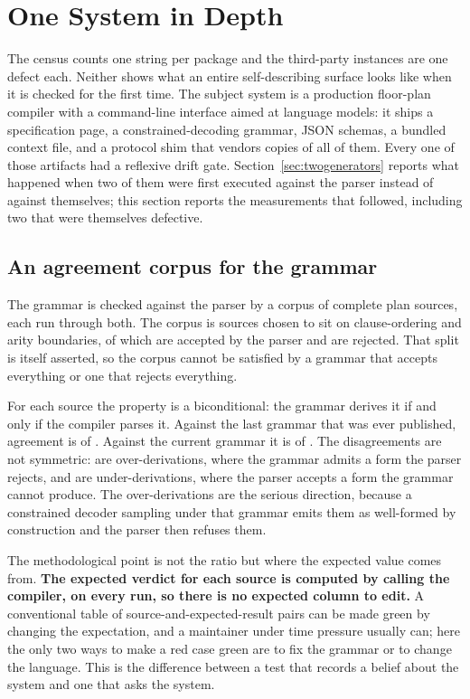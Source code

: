 \documentclass[10pt,journal,compsoc]{IEEEtran}
\begin{document}
\section{One System in Depth}\label{sec:depth}

The census counts one string per package and the third-party instances are one defect each.
Neither shows what an entire self-describing surface looks like when it is checked for the
first time. The subject system is a production floor-plan compiler with a command-line
interface aimed at language models: it ships a specification page, a constrained-decoding
grammar, JSON schemas, a bundled context file, and a protocol shim that vendors copies of all
of them. Every one of those artifacts had a reflexive drift gate. Section~\ref{sec:twogenerators}
reports what happened when two of them were first executed against the parser instead of
against themselves; this section reports the measurements that followed, including two that
were themselves defective.

\subsection{An agreement corpus for the grammar}

The grammar is checked against the parser by a corpus of complete plan sources, each run through
both. The corpus is \factGbnfCorpus{} sources chosen to sit on clause-ordering and arity
boundaries, of which \factGbnfParseable{} are accepted by the parser and \factGbnfRejected{} are
rejected. That split is itself asserted, so the corpus cannot be satisfied by a grammar that
accepts everything or one that rejects everything.

For each source the property is a biconditional: the grammar derives it if and only if the
compiler parses it. Against the last grammar that was ever published, agreement is
\factGbnfAgreeBefore{} of \factGbnfCorpus{}. Against the current grammar it is
\factGbnfAgreeNow{} of \factGbnfCorpus{}. The \factGbnfDisagree{} disagreements are not
symmetric: \factGbnfOverDerive{} are over-derivations, where the grammar admits a form the
parser rejects, and \factGbnfUnderDerive{} are under-derivations, where the parser accepts a
form the grammar cannot produce. The over-derivations are the serious direction, because a
constrained decoder sampling under that grammar emits them as well-formed by construction and
the parser then refuses them.

The methodological point is not the ratio but where the expected value comes from.
\textbf{The expected verdict for each source is computed by calling the compiler, on every run,
so there is no expected column to edit.} A conventional table of source-and-expected-result
pairs can be made green by changing the expectation, and a maintainer under time pressure
usually can; here the only two ways to make a red case green are to fix the grammar or to
change the language. This is the difference between a test that records a belief about the
system and one that asks the system.
\end{document}
